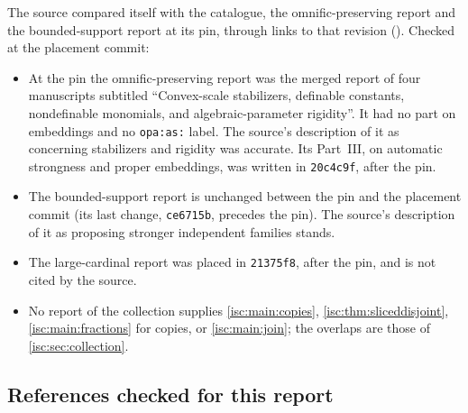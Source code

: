 \documentclass[11pt,letterpaper]{article}
\theoremstyle{definition}
\theoremstyle{remark}
\numberwithin{equation}{section}
\begin{document}
The source compared itself with the catalogue, the omnific-preserving
report and the bounded-support report at its pin, through links to that
revision (\cite{RepoCatalogue,RepoAuto,RepoBounded}). Checked at the
placement commit:
\begin{itemize}[leftmargin=*,itemsep=3pt]
\item At the pin the omnific-preserving report was the merged report of
four manuscripts subtitled ``Convex-scale stabilizers, definable constants,
nondefinable monomials, and algebraic-parameter rigidity''. It had no part
on embeddings and no \texttt{opa:as:} label. The source's description of it
as concerning stabilizers and rigidity was accurate. Its Part~III, on
automatic strongness and proper embeddings, was written in
\texttt{20c4c9f}, after the pin.
\item The bounded-support report is unchanged between the pin and the
placement commit (its last change, \texttt{ce6715b}, precedes the pin). The
source's description of it as proposing stronger independent families
stands.
\item The large-cardinal report was placed in \texttt{21375f8}, after the
pin, and is not cited by the source.
\item No report of the collection supplies \cref{isc:main:copies},
\cref{isc:thm:sliceddisjoint}, \cref{isc:main:fractions} for copies, or
\cref{isc:main:join}; the overlaps are those of \cref{isc:sec:collection}.
\end{itemize}

\subsection{References checked for this report}\label{isc:app:literature}
\end{document}
